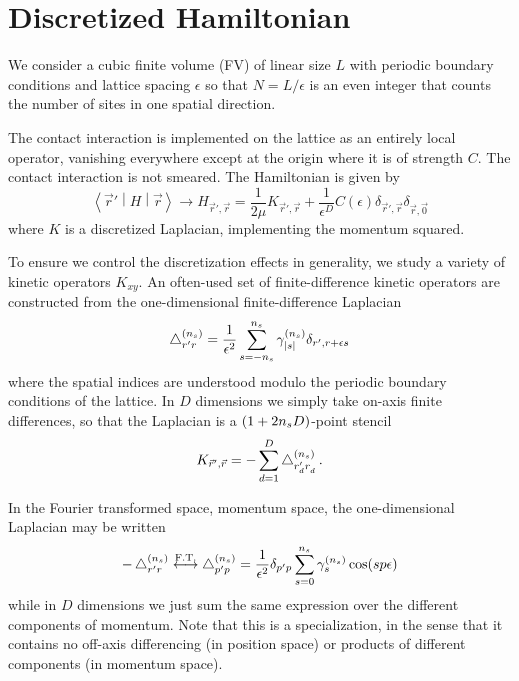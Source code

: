 \section{Discretized Hamiltonian}\label{sec:hamiltonian}

We consider a cubic finite volume (FV) of linear size $L$ with periodic boundary conditions and lattice spacing $\epsilon$ so that $N=L/\epsilon$ is an even integer that counts the number of sites in one spatial direction.

The contact interaction is implemented on the lattice as an entirely local operator, vanishing everywhere except at the origin where it is of strength $C$.
The contact interaction is not smeared.
The Hamiltonian is given by
\begin{equation}
    \left\langle \vec{r}' \middle| H \middle| \vec{r} \right\rangle
    \rightarrow
    H_{\vec{r}',\vec{r}}
    =
    \frac{1}{2\mu} K_{\vec{r}',\vec{r}} + \frac{1}{\epsilon^D} C(\epsilon) \delta_{\vec{r}',\vec{r}} \delta_{\vec{r},\vec{0}}
\end{equation}
where $K$ is a discretized Laplacian, implementing the momentum squared.

To ensure we control the discretization effects in generality, we study a variety of kinetic operators $K_{xy}$.
An often-used set of finite-difference kinetic operators are constructed from the one-dimensional finite-difference Laplacian
\begin{equation}
    \mathop{}\!\mathbin\bigtriangleup^{({n_s})}_{r'r} = \frac{1}{\epsilon^2}\sum_{s=-{n_s}}^{{n_s}} \gamma_{\left| s \right|}^{({n_s})} \delta_{r',r+\epsilon s}
\end{equation}
where the spatial indices are understood modulo the periodic boundary conditions of the lattice.
In $D$ dimensions we simply take on-axis finite differences, so that the Laplacian is a $(1+2{n_s} D)$-point stencil
\begin{equation}
    K_{\vec{r}',\vec{r}}
    =
    - \sum_{d=1}^D \mathop{}\!\mathbin\bigtriangleup_{r_d'r_d^{}}^{({n_s})}
    \, .
\end{equation}

In the Fourier transformed space, momentum space, the one-dimensional Laplacian may be written
\begin{equation}
    \label{eq:laplacian}
    -\mathop{}\!\mathbin\bigtriangleup_{r'r^{}}^{({n_s})}
    \overset{\text{F.T.}}{\longleftrightarrow}
    \mathop{}\!\mathbin\bigtriangleup^{({n_s})}_{p'p}
    =
    \frac{1}{\epsilon^2}
    \delta_{p'p}
    \sum_{s=0}^{{n_s}} \gamma_s^{({n_s})} \cos(s p \epsilon)
\end{equation}
while in $D$ dimensions we just sum the same expression over the different components of momentum.
Note that this is a specialization, in the sense that it contains no off-axis differencing (in position space) or products of different components (in momentum space).

